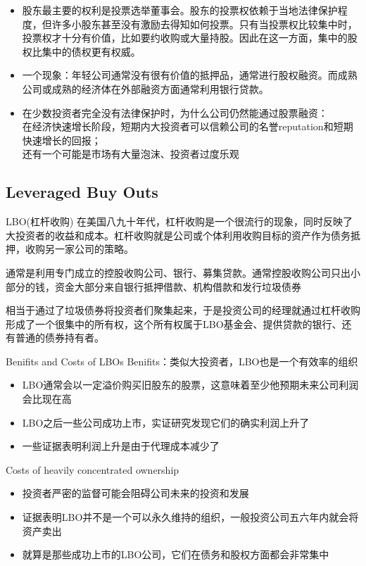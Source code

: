 	\begin{frame}{}
	\begin{itemize}
		\item 股东最主要的权利是投票选举董事会。股东的投票权依赖于当地法律保护程度，但许多小股东甚至没有激励去得知如何投票。只有当投票权比较集中时，投票权才十分有价值，比如要约收购或大量持股。因此在这一方面，集中的股权比集中的债权更有权威。
		\item 一个现象：年轻公司通常没有很有价值的抵押品，通常进行股权融资。而成熟公司或成熟的经济体在外部融资方面通常利用银行贷款。
		\item 在少数投资者完全没有法律保护时，为什么公司仍然能通过股票融资：\\在经济快速增长阶段，短期内大投资者可以信赖公司的名誉reputation和短期快速增长的回报；\\
		还有一个可能是市场有大量泡沫、投资者过度乐观
		\end{itemize}

\end{frame}

\subsection[LBO]{Leveraged Buy Outs}
	\begin{frame}{LBO(杠杆收购)}
	在美国八九十年代，杠杆收购是一个很流行的现象，同时反映了大投资者的收益和成本。杠杆收购就是公司或个体利用收购目标的资产作为债务抵押，收购另一家公司的策略。\par
	 通常是利用专门成立的控股收购公司、银行、募集贷款。通常控股收购公司只出小部分的钱，资金大部分来自银行抵押借款、机构借款和发行垃圾债券\par
	 相当于通过了垃圾债券将投资者们聚集起来，于是投资公司的经理就通过杠杆收购形成了一个很集中的所有权，这个所有权属于LBO基金会、提供贷款的银行、还有普通的债券持有者。
\end{frame}
\begin{frame}{Benifits and Costs of LBOs}
	Benifits：类似大投资者，LBO也是一个有效率的组织
	\begin{itemize}
		\item LBO通常会以一定溢价购买旧股东的股票，这意味着至少他预期未来公司利润会比现在高
		\item LBO之后一些公司成功上市，实证研究发现它们的确实利润上升了
		\item 一些证据表明利润上升是由于代理成本减少了
	\end{itemize}
	 Costs of heavily concentrated ownership
	\begin{itemize}
		\item 投资者严密的监督可能会阻碍公司未来的投资和发展
		\item 证据表明LBO并不是一个可以永久维持的组织，一般投资公司五六年内就会将资产卖出
		\item 就算是那些成功上市的LBO公司，它们在债务和股权方面都会非常集中
	\end{itemize}
\end{frame}

